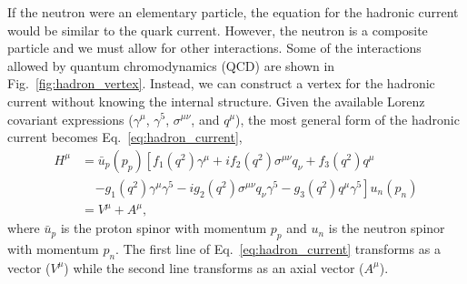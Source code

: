 \documentclass[oneside,12pt]{memoir}
\begin{document}
If the neutron were an elementary particle, the equation for the hadronic current would be similar to the quark current. However, the neutron is a composite particle and we must allow for other interactions. Some of the interactions allowed by quantum chromodynamics (QCD) are shown in Fig.~\ref{fig:hadron_vertex}. Instead, we can construct a vertex for the hadronic current without knowing the internal structure. Given the available Lorenz covariant expressions ($\gamma^\mu$, $\gamma^5$, $\sigma^{\mu\nu}$, and $q^\mu$), the most general form of the hadronic current becomes Eq.~\ref{eq:hadron_current},
\begin{align}
	H^\mu&=\bar{u}_p\left(p_p\right)
	\left[f_1\left(q^2\right)\gamma^\mu
	+if_2\left(q^2\right)\sigma^{\mu\nu}q_\nu
	+f_3\left(q^2\right)q^\mu\right.\nonumber\\
	&\;\;\;\;\left.-g_1\left(q^2\right)\gamma^\mu\gamma^5
	-ig_2\left(q^2\right)\sigma^{\mu\nu}q_\nu\gamma^5
	-g_3\left(q^2\right)q^\mu\gamma^5\right]
	u_n\left(p_n\right)\nonumber\\
	&=V^\mu+A^\mu,
	\label{eq:hadron_current}
\end{align}
where $\bar{u}_p$ is the proton spinor with momentum $p_p$ and $u_n$ is the neutron spinor with momentum $p_n$. The first line of Eq.~\ref{eq:hadron_current} transforms as a vector ($V^\mu$) while the second line transforms as an axial vector ($A^\mu$).
\end{document}
